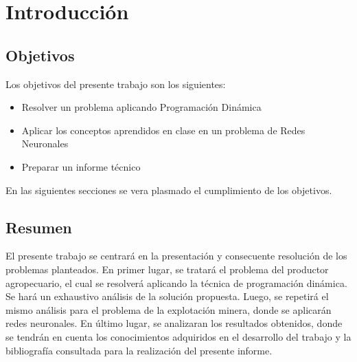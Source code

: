 \section{Introducción}

\subsection{Objetivos}
Los objetivos del presente trabajo son los siguientes:
\begin{itemize}
\item Resolver un problema aplicando Programación Dinámica
\item Aplicar los conceptos aprendidos en clase en un problema de Redes Neuronales
\item Preparar un informe técnico
\end{itemize}

En las siguientes secciones se vera plasmado el cumplimiento de los objetivos.\newline

\subsection{Resumen}
El presente trabajo se centrará en la presentación y consecuente resolución de los problemas planteados.\newline 
En primer lugar, se tratará el problema del productor agropecuario, el cual se resolverá aplicando la técnica de programación dinámica. Se hará un exhaustivo análisis de la solución propuesta.\newline
Luego, se repetirá el mismo análisis para el problema de la explotación minera, donde se aplicarán redes neuronales.\newline
En último lugar, se analizaran los resultados obtenidos, donde se tendrán en cuenta los conocimientos adquiridos en el desarrollo del trabajo y la bibliografía consultada para la realización del presente informe.
